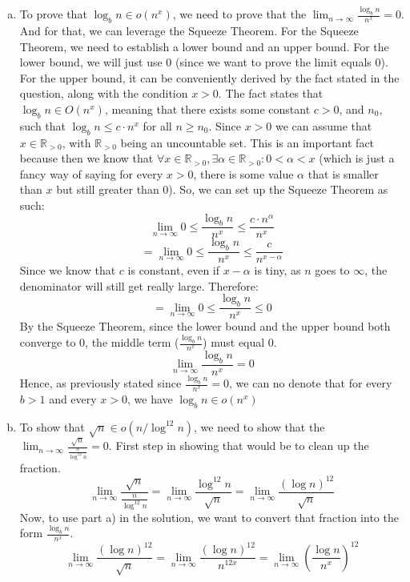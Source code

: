 \documentclass[letterpaper,11pt]{article}
\theoremstyle{plain}
\theoremstyle{definition}
\begin{document}
{\color{blue}
    \begin{enumerate}[a)]
    \item
    To prove that $\log_b n \in o(n^x)$, we need to prove that the $\lim_{n \to \infty} \frac{\log_b n}{n^x} = 0$. And for that, we can leverage the Squeeze Theorem. For the Squeeze Theorem, we need to establish a lower bound and an upper bound. For the lower bound, we will just use 0 (since we want to prove the limit equals 0). For the upper bound, it can be conveniently derived by the fact stated in the question, along with the condition $x > 0$. The fact states that $\log_b n \in O(n^x)$, meaning that there exists some constant $c > 0$, and $n_0$, such that $\log_b n \leq c \cdot n^x$ for all $n \geq n_0$. Since $x > 0$ we can assume that $x \in \mathbb{R}_{>0}$, with $\mathbb{R}_{>0}$ being an uncountable set. This is an important fact because then we know that $\forall x \in \mathbb{R}_{>0}, \exists\alpha \in \mathbb{R}_{>0} : 0 < \alpha < x$ (which is just a fancy way of saying for every $x > 0$, there is some value $\alpha$ that is smaller than $x$ but still greater than $0$). So, we can set up the Squeeze Theorem as such:
    \[\lim_{n \to \infty} 0 \leq \frac{\log_b n}{n^x} \leq \frac{c \cdot n^{\alpha}}{n^x}\]
    \[ = \lim_{n \to \infty} 0 \leq \frac{\log_b n}{n^x} \leq \frac{c}{n^{x - \alpha}}\]
    Since we know that $c$ is constant, even if $x-\alpha$ is tiny, as $n$ goes to $\infty$, the denominator will still get really large. Therefore:
    \[ = \lim_{n \to \infty} 0 \leq \frac{\log_b n}{n^x} \leq 0\]
    By the Squeeze Theorem, since the lower bound and the upper bound both converge to 0, the middle term ($\frac{\log_b n}{n^x}$) must equal 0.
    \[\lim_{n \to \infty} \frac{\log_b n}{n^x} = 0\]
    Hence, as previously stated since $\frac{\log_b n}{n^x} = 0$, we can no denote that for every $b > 1$ and every $x > 0$, we have $\log_b n \in o(n^x)$
    \item
    To show that $\sqrt{n} \in o(n/\log^{12} n)$, we need to show that the $\lim_{n \to \infty} \frac{\sqrt{n}}{\frac{n}{\log^{12} n}} = 0$. First step in showing that would be to clean up the fraction.
    \[\lim_{n \to \infty} \frac{\sqrt{n}}{\frac{n}{\log^{12} n}} = \lim_{n \to \infty} \frac{\log^{12} n}{\sqrt{n}} = \lim_{n \to \infty} \frac{(\log n)^{12}}{\sqrt{n}}\]
    Now, to use part a) in the solution, we want to convert that fraction into the form $\frac{\log_b n}{n^x}$.
    \[\lim_{n \to \infty} \frac{(\log n)^{12}}{\sqrt{n}} = \lim_{n \to \infty} \frac{(\log n)^{12}}{n^{12x}} = \lim_{n \to \infty} \left(\frac{\log n}{n^{x}}\right)^{12}\]

\end{enumerate}}
\end{document}

